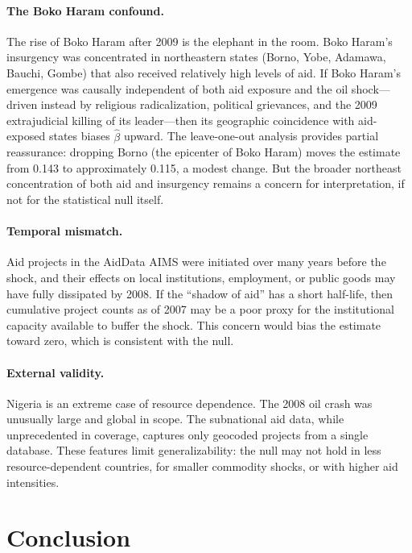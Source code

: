 \documentclass[12pt]{article}
\begin{document}
\paragraph{The Boko Haram confound.} The rise of Boko Haram after 2009 is the elephant in the room. Boko Haram's insurgency was concentrated in northeastern states (Borno, Yobe, Adamawa, Bauchi, Gombe) that also received relatively high levels of aid. If Boko Haram's emergence was causally independent of both aid exposure and the oil shock---driven instead by religious radicalization, political grievances, and the 2009 extrajudicial killing of its leader---then its geographic coincidence with aid-exposed states biases $\hat{\beta}$ upward. The leave-one-out analysis provides partial reassurance: dropping Borno (the epicenter of Boko Haram) moves the estimate from 0.143 to approximately 0.115, a modest change. But the broader northeast concentration of both aid and insurgency remains a concern for interpretation, if not for the statistical null itself.

\paragraph{Temporal mismatch.} Aid projects in the AidData AIMS were initiated over many years before the shock, and their effects on local institutions, employment, or public goods may have fully dissipated by 2008. If the ``shadow of aid'' has a short half-life, then cumulative project counts as of 2007 may be a poor proxy for the institutional capacity available to buffer the shock. This concern would bias the estimate toward zero, which is consistent with the null.

\paragraph{External validity.} Nigeria is an extreme case of resource dependence. The 2008 oil crash was unusually large and global in scope. The subnational aid data, while unprecedented in coverage, captures only geocoded projects from a single database. These features limit generalizability: the null may not hold in less resource-dependent countries, for smaller commodity shocks, or with higher aid intensities.


\section{Conclusion}
\label{sec:conclusion}
\end{document}
